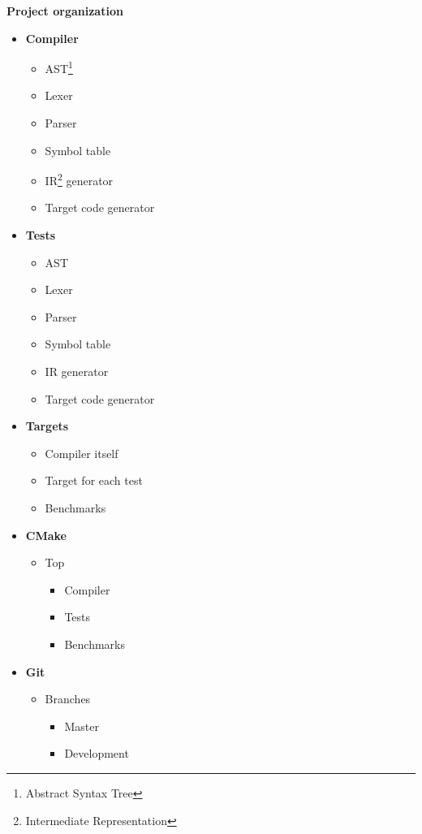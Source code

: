 \documentclass{article}
\begin{document}
	\textbf{{\Large Project organization}}
		\vskip 0.5cm	
		\begin{itemize}
			\item \textbf{Compiler}
				\begin{itemize}
					\item AST\footnote{Abstract Syntax Tree}
					\item Lexer
					\item Parser
					\item Symbol table
					\item IR\footnote{Intermediate Representation} generator
					\item Target code generator
				\end{itemize}
			\item \textbf{Tests}
				\begin{itemize}
					\item AST
					\item Lexer
					\item Parser
					\item Symbol table
					\item IR generator
					\item Target code generator
				\end{itemize}
			\item \textbf{Targets}
				\begin{itemize}
					\item Compiler itself
					\item Target for each test
					\item Benchmarks
				\end{itemize}
			\item \textbf{CMake}
				\begin{itemize}
					\item Top
					\begin{itemize}
						\item Compiler
						\item Tests
						\item Benchmarks
					\end{itemize}
				\end{itemize}
			\item \textbf{Git}
				\begin{itemize}
					\item Branches
					\begin{itemize}
						\item Master
						\item Development
					\end{itemize}
				\end{itemize}
		\end{itemize}
\end{document}
